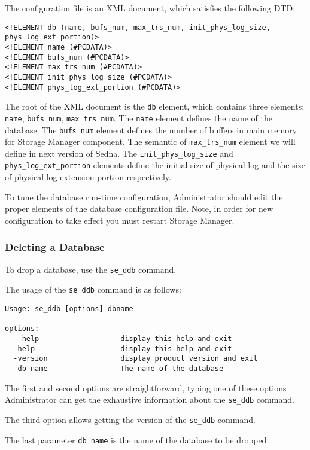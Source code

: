 \documentclass[a4paper,12pt]{article}
\begin{document}
The configuration file is an XML document, which satisfies the following DTD: 

\begin{verbatim}
<!ELEMENT db (name, bufs_num, max_trs_num, init_phys_log_size, phys_log_ext_portion)>
<!ELEMENT name (#PCDATA)>
<!ELEMENT bufs_num (#PCDATA)>
<!ELEMENT max_trs_num (#PCDATA)>
<!ELEMENT init_phys_log_size (#PCDATA)>
<!ELEMENT phys_log_ext_portion (#PCDATA)>
\end{verbatim}

The root of the XML document is the \verb!db! element, which contains three elements: \verb!name!, \verb!bufs_num!, \verb!max_trs_num!. The \verb!name! element defines the name of the database. The \verb!bufs_num! element defines the number of buffers in main memory for Storage Manager component. The semantic of \verb!max_trs_num! element we will define in next version of Sedna. The \verb!init_phys_log_size! and \verb!phys_log_ext_portion! elements define the initial size of physical log and the size of physical log extension portion respectively.

To tune the database run-time configuration, Administrator should edit the proper elements of the database configuration file. Note, in order for new configuration to take effect you must restart Storage Manager.

\subsubsection{Deleting a Database}

To drop a database, use the \verb!se_ddb! command.

The usage of the \verb!se_ddb! command is as follows:

\begin{verbatim}
Usage: se_ddb [options] dbname

options:
  --help                   display this help and exit
  -help                    display this help and exit
  -version                 display product version and exit
   db-name                 The name of the database
\end{verbatim}

The first and second options are straightforward, typing one of these options Administrator can get the exhaustive information about the \verb!se_ddb! command.

The third option allows getting the version of the \verb!se_ddb! command.

The last parameter \verb!db_name! is the name of the database to be dropped.
\end{document}
